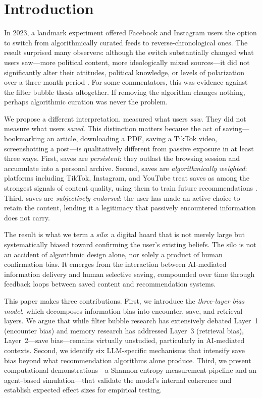 \documentclass[12pt,a4paper]{article}
\begin{document}
\newpage

\section{Introduction}

In 2023, a landmark experiment offered Facebook and Instagram users the option to switch from algorithmically curated feeds to reverse-chronological ones.
The result surprised many observers: although the switch substantially changed what users saw---more political content, more ideologically mixed sources---it did not significantly alter their attitudes, political knowledge, or levels of polarization over a three-month period \citep{Guess2023}.
For some commentators, this was evidence against the filter bubble thesis altogether.
If removing the algorithm changes nothing, perhaps algorithmic curation was never the problem.

We propose a different interpretation.
\citet{Guess2023} measured what users \emph{saw}.
They did not measure what users \emph{saved}.
This distinction matters because the act of saving---bookmarking an article, downloading a PDF, saving a TikTok video, screenshotting a post---is qualitatively different from passive exposure in at least three ways.
First, saves are \emph{persistent}: they outlast the browsing session and accumulate into a personal archive.
Second, saves are \emph{algorithmically weighted}: platforms including TikTok, Instagram, and YouTube treat saves as among the strongest signals of content quality, using them to train future recommendations \citep{SproutSocial2026}.
Third, saves are \emph{subjectively endorsed}: the user has made an active choice to retain the content, lending it a legitimacy that passively encountered information does not carry.

The result is what we term a \emph{silo}: a digital hoard that is not merely large but systematically biased toward confirming the user's existing beliefs.
The silo is not an accident of algorithmic design alone, nor solely a product of human confirmation bias.
It emerges from the interaction between AI-mediated information delivery and human selective saving, compounded over time through feedback loops between saved content and recommendation systems.

This paper makes three contributions.
First, we introduce the \emph{three-layer bias model}, which decomposes information bias into encounter, save, and retrieval layers.
We argue that while filter bubble research has extensively debated Layer~1 (encounter bias) and memory research has addressed Layer~3 (retrieval bias), Layer~2---save bias---remains virtually unstudied, particularly in AI-mediated contexts.
Second, we identify six LLM-specific mechanisms that intensify save bias beyond what recommendation algorithms alone produce.
Third, we present computational demonstrations---a Shannon entropy measurement pipeline and an agent-based simulation---that validate the model's internal coherence and establish expected effect sizes for empirical testing.
\end{document}
